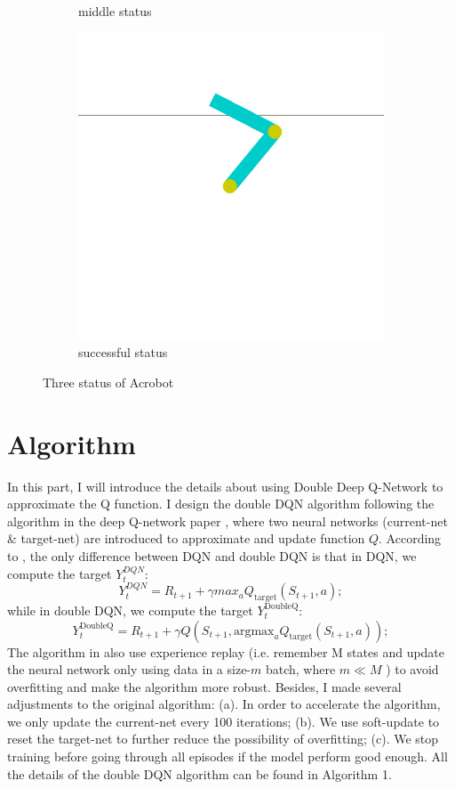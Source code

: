 \documentclass[11pt]{article}
\begin{document}
\begin{figure}[h]
\begin{subfigure}{0.33\textwidth}
    \caption{middle status}
  \end{subfigure}%
    \begin{subfigure}{0.33\textwidth}
    \centering
    \includegraphics[width=0.9\linewidth]{img13}
    \caption{successful status}
  \end{subfigure}%
  \caption{Three status of Acrobot}
\end{figure}



\section{Algorithm}

In this part, I will introduce the details about using Double Deep Q-Network to approximate the Q function. I design the double DQN algorithm following the algorithm in the deep Q-network paper \citep{mnih2015human}, where two neural networks (current-net \& target-net) are introduced to approximate and update function $Q$. According to \citet{van2016deep}, the only difference between DQN and double DQN is that in DQN, we compute the target $Y_t^{DQN}$:
$$
Y_t^{DQN} = R_{t+1} + \gamma max_a Q_{\mathrm{target}}(S_{t+1}, a);
$$
while in double DQN, we compute the target $Y_t^{\mathrm{DoubleQ}}$:
$$
Y_t^{\mathrm{DoubleQ}} = R_{t+1} + \gamma Q(S_{t+1}, \mathrm{argmax}_a Q_{\mathrm{target}}(S_{t+1}, a));
$$
The algorithm in \citep{mnih2015human} also use experience replay (i.e. remember M states and update the neural network only using data in a size-$m$ batch, where $m \ll M$ ) to avoid overfitting and make the algorithm more robust. Besides, I made several adjustments to the original algorithm: 
(a). In order to accelerate the algorithm, we only update the current-net every 100 iterations;
(b). We use soft-update to reset the target-net to further reduce the possibility of overfitting;
(c). We stop training before going through all episodes if the model perform good enough.
All the details of the double DQN algorithm can be found in Algorithm 1.
\end{document}

